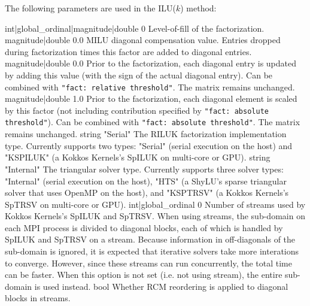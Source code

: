 The following parameters are used in the ILU($k$) method:

    {int|global\_ordinal|magnitude|double}
    {0}
    {Level-of-fill of the factorization.}
    {magnitude|double}
    {0.0}
    {MILU diagonal compensation value. Entries dropped during factorization
     times this factor are added to diagonal entries.}
    {magnitude|double}
    {0.0}
    {Prior to the factorization, each diagonal entry is updated by adding
     this value (with the sign of the actual diagonal entry). Can be combined
     with {\tt "fact: relative threshold"}. The matrix remains unchanged.}
    {magnitude|double}
    {1.0}
    {Prior to the factorization, each diagonal element is scaled by this factor
     (not including contribution specified by {\tt "fact: absolute
     threshold"}). Can be combined with {\tt "fact: absolute threshold"}.
     The matrix remains unchanged.}
    {string}
    {"Serial"}
    {The RILUK factorization implementation type. Currently supports two types:
     "Serial" (serial execution on the host) and "KSPILUK" (a Kokkos Kernels's
     SpILUK on multi-core or GPU).}
    {string}
    {"Internal"}
    {The triangular solver type. Currently supports three solver types:
     "Internal" (serial execution on the host), "HTS" (a ShyLU's sparse
     triangular solver that uses OpenMP on the host), and "KSPTRSV" (a Kokkos
     Kernels's SpTRSV on multi-core or GPU).}
    {int|global\_ordinal}
    {0}
    {Number of streams used by Kokkos Kernels's SpILUK and SpTRSV. When using
     streams, the sub-domain on each MPI process is divided to diagonal blocks,
     each of which is handled by SpILUK and SpTRSV on a stream. Because
     information in off-diagonals of the sub-domain is ignored, it is expected
     that iterative solvers take more interations to converge. However, since
     these streams can run concurrently, the total time can be faster. When
     this option is not set (i.e. not using stream), the entire sub-domain is
     used instead.}
    {bool}
    {\false}
    {Whether RCM reordering is applied to diagonal blocks in streams.}
%
%
%
%

